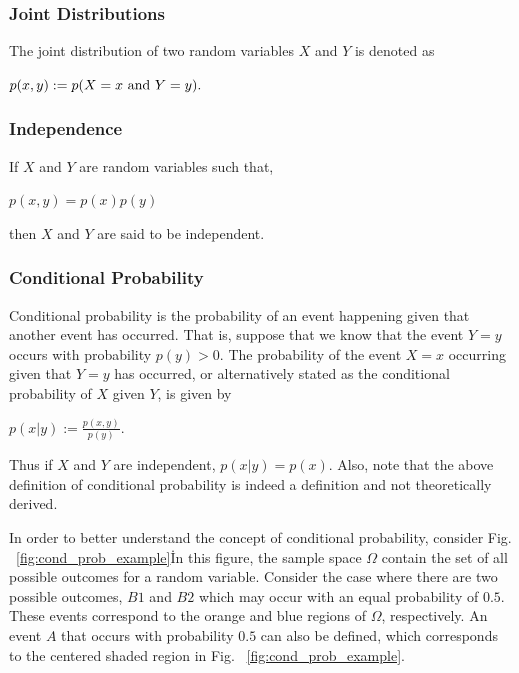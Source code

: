 \documentclass[twoside]{article}
\begin{document}
\subsubsection{Joint Distributions}

The joint distribution of two random variables $X$ and $Y$ is denoted as \begin{center}
$p(x,y):=p(X=x\ \textnormal{and}\ Y=y).$
\end{center}

\subsubsection{Independence}

If $X$ and $Y$ are random variables such that, 
\begin{center}
$p(x,y)=p(x)p(y)$
\end{center}
then $X$ and $Y$ are said to be independent.

\subsubsection{Conditional Probability}

Conditional probability is the probability of an event happening given that another event has occurred. That is, suppose that we know that the event $Y = y$ occurs with probability $p(y) > 0$. The probability of the event $X=x$ occurring given that $Y=y$ has occurred, or alternatively stated as the conditional probability of $X$ given $Y$, is given by

\begin{center}
$p(x|y):=\frac{p(x,y)}{p(y)}.$
\end{center}

Thus if $X$ and $Y$ are independent, $p(x|y)=p(x)$. Also, note that the above definition of conditional probability is indeed a definition and not theoretically derived.

In order to better understand the concept of conditional probability, consider Fig. ~\ref{fig:cond_prob_example}\. In this figure, the sample space $\Omega$ contain the set of all possible outcomes for a random variable. Consider the case where there are two possible outcomes, $B1$ and $B2$ which may occur with an equal probability of $0.5$. These events correspond to the orange and blue regions of $\Omega$, respectively. An event $A$ that occurs with probability $0.5$ can also be defined, which corresponds to the centered shaded region in Fig. ~\ref{fig:cond_prob_example}. 
\end{document}
